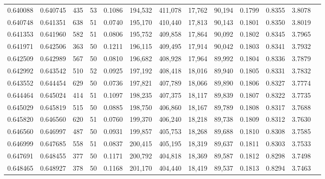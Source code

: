 \begin{tabular}{rrrrrrrrrrrrr}
0.640088 & 0.640745 &   435 &  53 &                                     0.1086 & 194,532 & 411,078 &  17,762 &  90,194 & 0.1799 & 0.8355 & 3.8078 \\
0.640748 & 0.641351 &   638 &  51 &                                     0.0740 & 195,170 & 410,440 &  17,813 &  90,143 & 0.1801 & 0.8350 & 3.8019 \\
0.641353 & 0.641960 &   582 &  51 &                                     0.0806 & 195,752 & 409,858 &  17,864 &  90,092 & 0.1802 & 0.8345 & 3.7965 \\
0.641971 & 0.642506 &   363 &  50 &                                     0.1211 & 196,115 & 409,495 &  17,914 &  90,042 & 0.1803 & 0.8341 & 3.7932 \\
0.642509 & 0.642989 &   567 &  50 &                                     0.0810 & 196,682 & 408,928 &  17,964 &  89,992 & 0.1804 & 0.8336 & 3.7879 \\
0.642992 & 0.643542 &   510 &  52 &                                     0.0925 & 197,192 & 408,418 &  18,016 &  89,940 & 0.1805 & 0.8331 & 3.7832 \\
0.643552 & 0.644454 &   629 &  50 &                                     0.0736 & 197,821 & 407,789 &  18,066 &  89,890 & 0.1806 & 0.8327 & 3.7774 \\
0.644464 & 0.645024 &   414 &  51 &                                     0.1097 & 198,235 & 407,375 &  18,117 &  89,839 & 0.1807 & 0.8322 & 3.7735 \\
0.645029 & 0.645819 &   515 &  50 &                                     0.0885 & 198,750 & 406,860 &  18,167 &  89,789 & 0.1808 & 0.8317 & 3.7688 \\
0.645820 & 0.646560 &   620 &  51 &                                     0.0760 & 199,370 & 406,240 &  18,218 &  89,738 & 0.1809 & 0.8312 & 3.7630 \\
0.646560 & 0.646997 &   487 &  50 &                                     0.0931 & 199,857 & 405,753 &  18,268 &  89,688 & 0.1810 & 0.8308 & 3.7585 \\
0.646999 & 0.647685 &   558 &  51 &                                     0.0837 & 200,415 & 405,195 &  18,319 &  89,637 & 0.1811 & 0.8303 & 3.7533 \\
0.647691 & 0.648455 &   377 &  50 &                                     0.1171 & 200,792 & 404,818 &  18,369 &  89,587 & 0.1812 & 0.8298 & 3.7498 \\
0.648465 & 0.648927 &   378 &  50 &                                     0.1168 & 201,170 & 404,440 &  18,419 &  89,537 & 0.1813 & 0.8294 & 3.7463 \\

\end{tabular}
